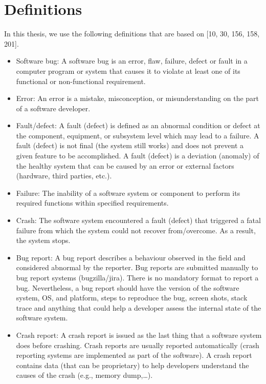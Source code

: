 \documentclass[12pt]{report}
\providecommand{\tightlist}{%
  \setlength{\itemsep}{0pt}\setlength{\parskip}{0pt}}
\begin{document}
\section{\texorpdfstring{Definitions\label{sec:version-control}}{Definitions}}\label{definitions}

In this thesis, we use the following definitions that are based on
{[}10, 30, 156, 158, 201{]}.

\begin{itemize}
\tightlist
\item
  Software bug: A software bug is an error, flaw, failure, defect or
  fault in a computer program or system that causes it to violate at
  least one of its functional or non-functional requirement.
\item
  Error: An error is a mistake, misconception, or misunderstanding on
  the part of a software developer.
\item
  Fault/defect: A fault (defect) is defined as an abnormal condition or
  defect at the component, equipment, or subsystem level which may lead
  to a failure. A fault (defect) is not final (the system still works)
  and does not prevent a given feature to be accomplished. A fault
  (defect) is a deviation (anomaly) of the healthy system that can be
  caused by an error or external factors (hardware, third parties,
  etc.).
\item
  Failure: The inability of a software system or component to perform
  its required functions within specified requirements.
\item
  Crash: The software system encountered a fault (defect) that triggered
  a fatal failure from which the system could not recover from/overcome.
  As a result, the system stops.
\item
  Bug report: A bug report describes a behaviour observed in the field
  and considered abnormal by the reporter. Bug reports are submitted
  manually to bug report systems (bugzilla/jira). There is no mandatory
  format to report a bug. Nevertheless, a bug report should have the
  version of the software system, OS, and platform, steps to reproduce
  the bug, screen shots, stack trace and anything that could help a
  developer assess the internal state of the software system.
\item
  Crash report: A crash report is issued as the last thing that a
  software system does before crashing. Crash reports are usually
  reported automatically (crash reporting systems are implemented as
  part of the software). A crash report contains data (that can be
  proprietary) to help developers understand the causes of the crash
  (e.g., memory dump,\ldots{}).
\end{itemize}
\end{document}
